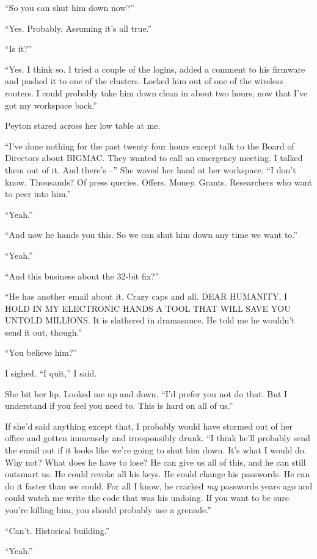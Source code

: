 “So you can shut him down now?”

“Yes. Probably. Assuming it's all true.”

“Is it?”

“Yes. I think so. I tried a couple of the logins, added a comment to 
his firmware and pushed it to one of the clusters. Locked him out of 
one of the wireless routers. I could probably take him down clean in 
about two hours, now that I've got my workspace back.”

Peyton stared across her low table at me.

“I've done nothing for the past twenty four hours except talk to the 
Board of Directors about BIGMAC. They wanted to call an emergency 
meeting. I talked them out of it. And there's --” She waved her hand 
at her workspace. “I don't know. Thousands? Of press queries. Offers. 
Money. Grants. Researchers who want to peer into him.”

“Yeah.”

“And now he hands you this. So we can shut him down any time we want 
to.”

“Yeah.”

“And this business about the 32-bit fix?”

“He has another email about it. Crazy caps and all. DEAR HUMANITY, I 
HOLD IN MY ELECTRONIC HANDS A TOOL THAT WILL SAVE YOU UNTOLD MILLIONS. 
It is slathered in dramasauce. He told me he wouldn't send it out, 
though.”

“You believe him?”

I sighed. “I quit,” I said.

She bit her lip. Looked me up and down. “I'd prefer you not do that. 
But I understand if you feel you need to. This is hard on all of us.”

If she'd said anything except that, I probably would have stormed out 
of her office and gotten immensely and irresponsibly drunk. “I think 
he'll probably send the email out if it looks like we're going to shut 
him down. It's what I would do. Why not? What does he have to lose? He 
can give us all of this, and he can still outsmart us. He could revoke 
all his keys. He could change his passwords. He can do it faster than 
we could. For all I know, he cracked \emph{my} passwords years ago and 
could watch me write the code that was his undoing. If you want to be 
sure you're killing him, you should probably use a grenade.”

“Can't. Historical building.”

“Yeah.”

